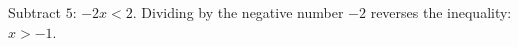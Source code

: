 Subtract $5$: $-2x<2$. Dividing by the negative number $-2$ reverses the inequality: $\boxed{x>-1}$.
